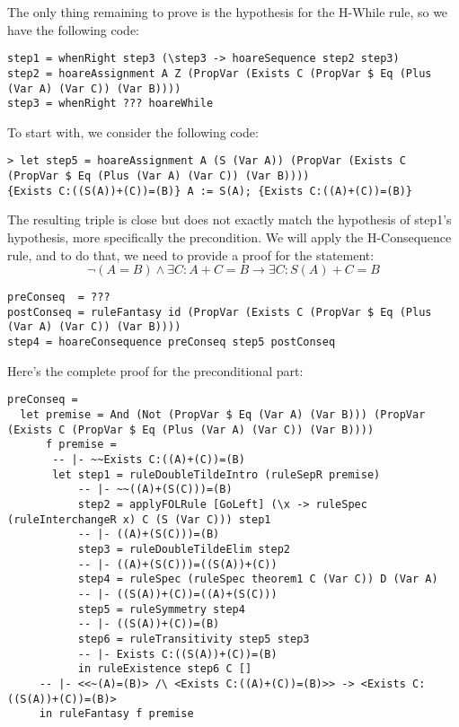 \documentclass{article}
\begin{document}
The only thing remaining to prove is the hypothesis for the H-While rule, so we have the following code:

\begin{lstlisting}
step1 = whenRight step3 (\step3 -> hoareSequence step2 step3)
step2 = hoareAssignment A Z (PropVar (Exists C (PropVar $ Eq (Plus (Var A) (Var C)) (Var B))))
step3 = whenRight ??? hoareWhile
\end{lstlisting}

To start with, we consider the following code:

\begin{lstlisting}
> let step5 = hoareAssignment A (S (Var A)) (PropVar (Exists C (PropVar $ Eq (Plus (Var A) (Var C)) (Var B))))
{Exists C:((S(A))+(C))=(B)} A := S(A); {Exists C:((A)+(C))=(B)}
\end{lstlisting}

The resulting triple is close but does not exactly match the hypothesis of step1's hypothesis, more specifically the precondition. We will apply the H-Consequence rule, and to do that, we need to provide a proof for the statement:
$$\neg (A = B) \land \exists C: A + C = B \to \exists C: S(A) + C = B$$

\begin{lstlisting}
preConseq  = ???
postConseq = ruleFantasy id (PropVar (Exists C (PropVar $ Eq (Plus (Var A) (Var C)) (Var B))))
step4 = hoareConsequence preConseq step5 postConseq
\end{lstlisting}

Here's the complete proof for the preconditional part:

\begin{lstlisting}
preConseq =
  let premise = And (Not (PropVar $ Eq (Var A) (Var B))) (PropVar (Exists C (PropVar $ Eq (Plus (Var A) (Var C)) (Var B))))
      f premise =
       -- |- ~~Exists C:((A)+(C))=(B)
       let step1 = ruleDoubleTildeIntro (ruleSepR premise)
           -- |- ~~((A)+(S(C)))=(B)
           step2 = applyFOLRule [GoLeft] (\x -> ruleSpec (ruleInterchangeR x) C (S (Var C))) step1
           -- |- ((A)+(S(C)))=(B)
           step3 = ruleDoubleTildeElim step2
           -- |- ((A)+(S(C)))=((S(A))+(C))
           step4 = ruleSpec (ruleSpec theorem1 C (Var C)) D (Var A)
           -- |- ((S(A))+(C))=((A)+(S(C)))
           step5 = ruleSymmetry step4
           -- |- ((S(A))+(C))=(B)
           step6 = ruleTransitivity step5 step3
           -- |- Exists C:((S(A))+(C))=(B)
           in ruleExistence step6 C []
     -- |- <<~(A)=(B)> /\ <Exists C:((A)+(C))=(B)>> -> <Exists C:((S(A))+(C))=(B)>
     in ruleFantasy f premise
\end{lstlisting}
\end{document}
